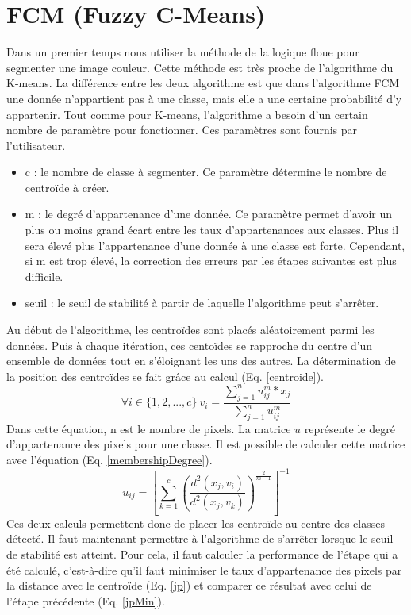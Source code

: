 \documentclass[a4paper,11pt]{article}
\begin{document}
\section{FCM (Fuzzy C-Means)}
Dans un premier temps nous utiliser la méthode de la logique floue pour segmenter une image couleur. 
Cette méthode est très proche de l'algorithme du K-means. La différence entre les deux algorithme
est que dans l'algorithme FCM une donnée n'appartient pas à une classe, mais elle a une certaine
probabilité d'y appartenir. Tout comme pour K-means, l'algorithme a besoin d'un certain nombre de
paramètre pour fonctionner. Ces paramètres sont fournis par l'utilisateur.
\begin{itemize}
  \item c : le nombre de classe à segmenter. Ce paramètre détermine le nombre de centroïde à créer.
  \item m : le degré d'appartenance d'une donnée. Ce paramètre permet d'avoir un plus ou moins grand écart
  entre les taux d'appartenances aux classes. Plus il sera élevé plus l'appartenance d'une donnée à une classe
  est forte. Cependant, si m est trop élevé, la correction des erreurs par les étapes suivantes est plus difficile.
  \item seuil : le seuil de stabilité à partir de laquelle l'algorithme peut s’arrêter.
\end{itemize}
Au début de l'algorithme, les centroïdes sont placés aléatoirement parmi les données. Puis à chaque itération,
ces centoïdes se rapproche du centre d'un ensemble de données tout en s'éloignant les uns des autres. La détermination
de la position des centroïdes se fait grâce au calcul (Eq. \ref{centroide}).
\begin{equation}
  \label{centroide}
  \forall i \in \{1, 2, ..., c\} \ v_i = \frac{\sum_{j=1}^{n} u_{ij}^m * x_j}{\sum_{j=1}^{n} u_{ij}^m}
\end{equation}
Dans cette équation, n est le nombre de pixels. La matrice $u$ représente
le degré d'appartenance des pixels pour une classe. Il est possible de calculer cette matrice avec l'équation
(Eq. \ref{membershipDegree}).
\begin{equation}
 \label{membershipDegree}
  u_{ij}=\left[\sum_{k=1}^{c} \left(\frac{d^2(x_j, v_i)}{d^2(x_j, v_k)}\right)^{\frac{2}{m-1}}\right]^{-1}
\end{equation}
Ces deux calculs permettent donc de placer les centroïde au centre des classes détecté. Il faut maintenant permettre
à l'algorithme de s’arrêter lorsque le seuil de stabilité est atteint. Pour cela, il faut calculer la performance
de l'étape qui a été calculé, c'est-à-dire qu'il faut minimiser le taux d'appartenance des pixels par la distance
avec le centroïde (Eq. \ref{jp}) et comparer ce résultat avec celui de l'étape précédente (Eq. \ref{jpMin}).
\end{document}
